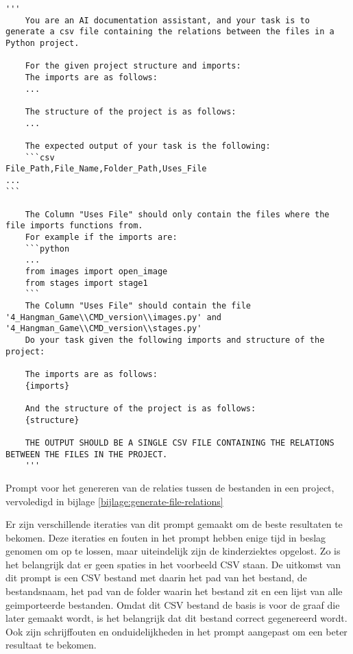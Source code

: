 \begin{listing}
    \begin{verbatim}
'''
    You are an AI documentation assistant, and your task is to generate a csv file containing the relations between the files in a Python project.

    For the given project structure and imports:
    The imports are as follows:
    ...
    
    The structure of the project is as follows:
    ...
    
    The expected output of your task is the following:
    ```csv
File_Path,File_Name,Folder_Path,Uses_File
... 
```

    The Column "Uses File" should only contain the files where the file imports functions from.
    For example if the imports are:
    ```python
    ...
    from images import open_image
    from stages import stage1
    ```
    The Column "Uses File" should contain the file '4_Hangman_Game\\CMD_version\\images.py' and '4_Hangman_Game\\CMD_version\\stages.py'
    Do your task given the following imports and structure of the project:
    
    The imports are as follows:
    {imports}

    And the structure of the project is as follows:
    {structure}

    THE OUTPUT SHOULD BE A SINGLE CSV FILE CONTAINING THE RELATIONS BETWEEN THE FILES IN THE PROJECT.
    '''
\end{verbatim}
\caption{Prompt voor het genereren van de relaties tussen de bestanden in een project, vervoledigd in bijlage \ref{bijlage:generate-file-relations}}
\label{lst:generate-file-relations}
\end{listing}

Er zijn verschillende iteraties van dit prompt gemaakt om de beste resultaten te bekomen.
Deze iteraties en fouten in het prompt hebben enige tijd in beslag genomen om op te lossen, maar uiteindelijk zijn de kinderziektes opgelost.
Zo is het belangrijk dat er geen spaties in het voorbeeld CSV staan.
De uitkomst van dit prompt is een CSV bestand met daarin het pad van het bestand, de bestandsnaam, het pad van de folder waarin het bestand zit en een lijst van alle geimporteerde bestanden.
Omdat dit CSV bestand de basis is voor de graaf die later gemaakt wordt, is het belangrijk dat dit bestand correct gegenereerd wordt.
Ook zijn schrijffouten en onduidelijkheden in het prompt aangepast om een beter resultaat te bekomen.


